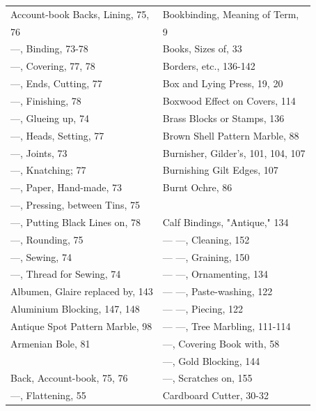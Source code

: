 \documentclass[twoside]{book}
\begin{document}
\begin{center}
\begin{tiny}
\begin{tabular}{l l}
Account-book Backs, Lining, 75,  & Bookbinding, Meaning of Term,         \\
    76                           & 9                                     \\
---, Binding, 73-78             & Books, Sizes of, 33                   \\
---, Covering, 77, 78           & Borders, etc., 136-142                \\
---, Ends, Cutting, 77          & Box and Lying Press, 19, 20           \\
---, Finishing, 78              & Boxwood Effect on Covers, 114         \\
---, Glueing up, 74             & Brass Blocks or Stamps, 136           \\
---, Heads, Setting, 77         & Brown Shell Pattern Marble, 88        \\
---, Joints, 73                 & Burnisher, Gilder's, 101, 104, 107    \\
---, Knatching; 77              & Burnishing Gilt Edges, 107            \\
---, Paper, Hand-made, 73       & Burnt Ochre, 86                       \\
---, Pressing, between Tins, 75 &                                       \\
---, Putting Black Lines on, 78 & Calf Bindings, "Antique," 134         \\
---, Rounding, 75               & --- ---, Cleaning, 152              \\
---, Sewing, 74                 & --- ---, Graining, 150              \\
---, Thread for Sewing, 74      & --- ---, Ornamenting, 134           \\
Albumen, Glaire replaced by, 143 & --- ---, Paste-washing, 122         \\
Aluminium Blocking, 147, 148     & --- ---, Piecing, 122               \\
Antique Spot Pattern Marble, 98  & --- ---, Tree Marbling, 111-114     \\
Armenian Bole, 81                & ---, Covering Book with, 58          \\
                                 & ---, Gold Blocking, 144              \\
Back, Account-book, 75, 76       & ---, Scratches on, 155               \\
---, Flattening, 55             & Cardboard Cutter, 30-32               \\

\end{tabular}
\end{tiny}
\end{center}
\end{document}
